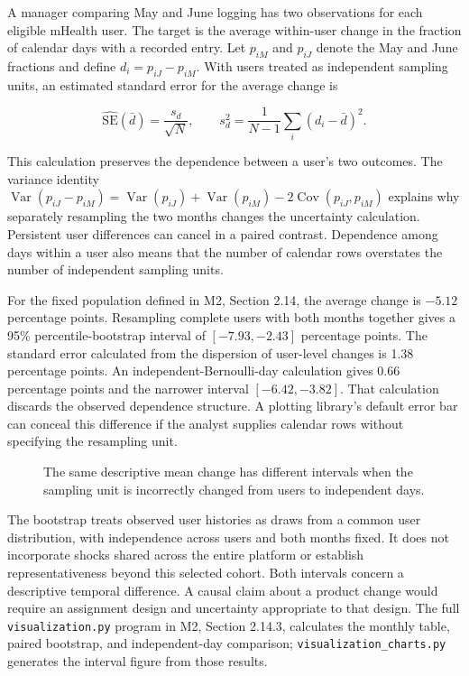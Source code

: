 \noindent A manager comparing May and June logging has two observations for each
eligible mHealth user. The target is the average within-user change in
the fraction of calendar days with a recorded entry. Let \(p_{iM}\) and
\(p_{iJ}\) denote the May and June fractions and define
\(d_i=p_{iJ}-p_{iM}\). With users treated as independent sampling units,
an estimated standard error for the average change is

\[
\widehat{\mathrm{SE}}(\bar d)=\frac{s_d}{\sqrt N},\qquad
s_d^2=\frac{1}{N-1}\sum_i(d_i-\bar d)^2.
\]

This calculation preserves the dependence between a user's two outcomes.
The variance identity
\(\operatorname{Var}(p_{iJ}-p_{iM})=\operatorname{Var}(p_{iJ})+\operatorname{Var}(p_{iM})-2\operatorname{Cov}(p_{iJ},p_{iM})\)
explains why separately resampling the two months changes the
uncertainty calculation. Persistent user differences can cancel in a
paired contrast. Dependence among days within a user also means that the
number of calendar rows overstates the number of independent sampling
units.

For the fixed population defined in M2, Section 2.14, the average change
is \(-5.12\) percentage points. Resampling complete users with both
months together gives a 95\% percentile-bootstrap interval of
\([-7.93,-2.43]\) percentage points. The standard error calculated from
the dispersion of user-level changes is 1.38 percentage points. An
independent-Bernoulli-day calculation gives 0.66 percentage points and
the narrower interval \([-6.42,-3.82]\). That calculation discards the
observed dependence structure. A plotting library's default error bar
can conceal this difference if the analyst supplies calendar rows
without specifying the resampling unit.

\begin{figure}[htbp]
\centering

\caption{The same descriptive mean change has different intervals when the sampling unit is incorrectly changed from users to independent days.}\label{fig:M03_logging_uncertainty}
\end{figure}

The bootstrap treats observed user histories as draws from a common user
distribution, with independence across users and both months fixed. It
does not incorporate shocks shared across the entire platform or
establish representativeness beyond this selected cohort. Both intervals
concern a descriptive temporal difference. A causal claim about a
product change would require an assignment design and uncertainty
appropriate to that design. The full \texttt{visualization.py} program
in M2, Section 2.14.3, calculates the monthly table, paired bootstrap,
and independent-day comparison; \texttt{visualization\_charts.py}
generates the interval figure from those results.

